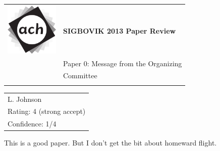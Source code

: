 \documentclass[12pt]{article}
\begin{document}
{\sffamily
\begin{tabular}{ll}
\multirow{3}{*}{\includegraphics[width=1in]{ach.png}}\\
& \textbf{\Huge{SIGBOVIK 2013 Paper Review}} \\ &\\
& \LARGE{Paper 0: Message from the Organizing} \\
& \LARGE{Committee} \\
&\\
\hline
\end{tabular}}
\vspace{2em}

{\large\bf
\begin{tabular}{l}
L. Johnson \\
Rating: 4 (strong accept) \\
Confidence: 1/4 \\
\end{tabular}}
\vspace{1em}

This is a good paper. But I don't get the bit about homeward flight.
\end{document}
